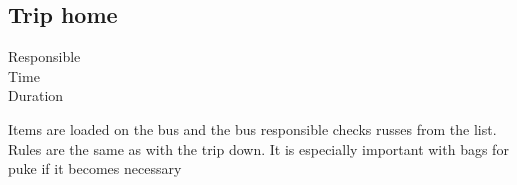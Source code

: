 \documentclass[../../../main.tex]{subfiles}
\begin{document}
\subsection{Trip home}

\begin{description}
\item[Responsible] \placeholder
\item[Time] \placeholder
\item[Duration] \placeholder
\end{description}

Items are loaded on the bus and the bus responsible checks russes from the list. Rules are the same as with the trip down. It is especially important with bags for puke if it becomes necessary
\end{document}
